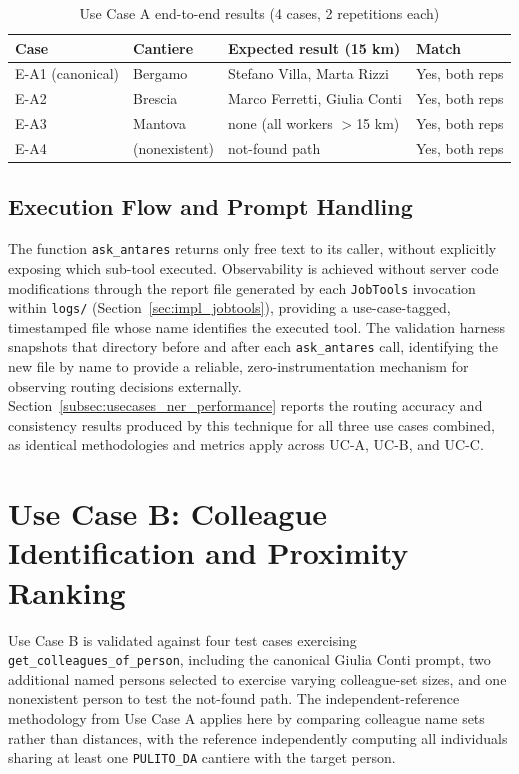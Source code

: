 \begin{table}[htbp]
\centering
\caption{Use Case A end-to-end results (4 cases, 2 repetitions each)}
\label{tab:uca_e2e}
\begin{tabular}{llll}
\hline
\textbf{Case} & \textbf{Cantiere} & \textbf{Expected result (15 km)} & \textbf{Match} \\
\hline
E-A1 (canonical) & Bergamo & Stefano Villa, Marta Rizzi & Yes, both reps \\
E-A2 & Brescia & Marco Ferretti, Giulia Conti & Yes, both reps \\
E-A3 & Mantova & none (all workers $>$15 km) & Yes, both reps \\
E-A4 & (nonexistent) & not-found path & Yes, both reps \\
\hline
\end{tabular}
\end{table}

\subsection{Execution Flow and Prompt Handling}
\label{subsec:usecases_spatial_flow}

The function \texttt{ask\_antares} returns only free text to its caller, without explicitly exposing which sub-tool executed. Observability is achieved without server code modifications through the report file generated by each \texttt{JobTools} invocation within \texttt{logs/} (Section~\ref{sec:impl_jobtools}), providing a use-case-tagged, timestamped file whose name identifies the executed tool. The validation harness snapshots that directory before and after each \texttt{ask\_antares} call, identifying the new file by name to provide a reliable, zero-instrumentation mechanism for observing routing decisions externally. Section~\ref{subsec:usecases_ner_performance} reports the routing accuracy and consistency results produced by this technique for all three use cases combined, as identical methodologies and metrics apply across UC-A, UC-B, and UC-C.

\section{Use Case B: Colleague Identification and Proximity Ranking}
\label{sec:usecases_colleague_identification}

Use Case B is validated against four test cases exercising \texttt{get\_colleagues\_of\_person}, including the canonical Giulia Conti prompt, two additional named persons selected to exercise varying colleague-set sizes, and one nonexistent person to test the not-found path. The independent-reference methodology from Use Case A applies here by comparing colleague name sets rather than distances, with the reference independently computing all individuals sharing at least one \texttt{PULITO\_DA} cantiere with the target person.

